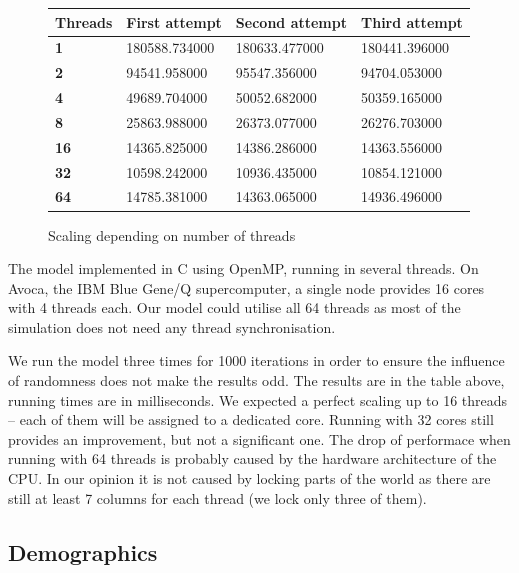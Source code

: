 \documentclass[a4paper]{article}
\begin{document}
\begin{figure}[ht]
    \centering
    \begin{tabu} {| X[0.8,c,p] || X[1,c,p] | X[1,c,p] | X[1,c,p] |}
        \rowfont{\bfseries}
        \hline
        Threads &
        First attempt &
        Second attempt&
        Third attempt \\
        \hline
        \hline
        \textbf{1} & 180588.734000 & 180633.477000 & 180441.396000 \\
        \hline
        \textbf{2} & 94541.958000 & 95547.356000 & 94704.053000 \\
        \hline
        \textbf{4} & 49689.704000 & 50052.682000 & 50359.165000 \\
        \hline
        \textbf{8} & 25863.988000 & 26373.077000 & 26276.703000 \\
        \hline
        \textbf{16} & 14365.825000 & 14386.286000 & 14363.556000 \\
        \hline
        \textbf{32} & 10598.242000 & 10936.435000 & 10854.121000 \\
        \hline
        \textbf{64} & 14785.381000 & 14363.065000 & 14936.496000 \\
        \hline
    \end{tabu}
    \caption{Scaling depending on number of threads}
\end{figure}

The model implemented in C using OpenMP, running in several threads.
On Avoca, the IBM Blue Gene/Q supercomputer, a single node provides 16 cores with 4 threads each.
Our model could utilise all 64 threads as most of the simulation does not need any thread synchronisation.

We run the model three times for 1000 iterations in order to ensure the influence of randomness does not make the results odd.
The results are in the table above, running times are in milliseconds.
We expected a perfect scaling up to 16 threads -- each of them will be assigned to a dedicated core.
Running with 32 cores still provides an improvement, but not a significant one.
The drop of performace when running with 64 threads is probably caused by the hardware architecture of the CPU.
In our opinion it is not caused by locking parts of the world as there are still at least 7 columns for each thread (we lock only three of them).

\subsection{Demographics}
\end{document}
